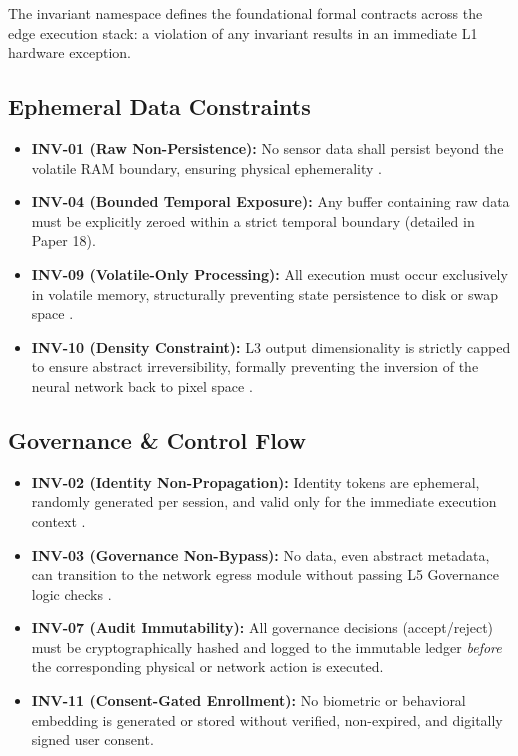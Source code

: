 \documentclass[conference]{IEEEtran}
\begin{document}
The invariant namespace defines the foundational formal contracts across the edge execution stack: a violation of any invariant results in an immediate L1 hardware exception.

\subsection{Ephemeral Data Constraints}
\begin{itemize}
    \item \textbf{INV-01 (Raw Non-Persistence):} No sensor data shall persist beyond the volatile RAM boundary, ensuring physical ephemerality \cite{P3}. 
    \item \textbf{INV-04 (Bounded Temporal Exposure):} Any buffer containing raw data must be explicitly zeroed within a strict temporal boundary (detailed in Paper 18). 
    \item \textbf{INV-09 (Volatile-Only Processing):} All execution must occur exclusively in volatile memory, structurally preventing state persistence to disk or swap space \cite{P12}.
    \item \textbf{INV-10 (Density Constraint):} L3 output dimensionality is strictly capped to ensure abstract irreversibility, formally preventing the inversion of the neural network back to pixel space \cite{P3}.
\end{itemize}

\subsection{Governance \& Control Flow}
\begin{itemize}
    \item \textbf{INV-02 (Identity Non-Propagation):} Identity tokens are ephemeral, randomly generated per session, and valid only for the immediate execution context \cite{P3, P9}.
    \item \textbf{INV-03 (Governance Non-Bypass):} No data, even abstract metadata, can transition to the network egress module without passing L5 Governance logic checks \cite{P9}.
    \item \textbf{INV-07 (Audit Immutability):} All governance decisions (accept/reject) must be cryptographically hashed and logged to the immutable ledger \textit{before} the corresponding physical or network action is executed.
    \item \textbf{INV-11 (Consent-Gated Enrollment):} No biometric or behavioral embedding is generated or stored without verified, non-expired, and digitally signed user consent.
\end{itemize}
\end{document}
